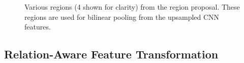 \documentclass[journal]{IEEEtran}
\begin{document}
\begin{figure}[t]
\vspace{-0.5 cm}
\renewcommand*\thesubfigure{\arabic{subfigure}}
    \centering
    \hfill
        \hfill
            \hfill
    \caption{Various regions (4 shown for clarity) from the region proposal. These regions are used for bilinear pooling from the upsampled CNN features. }
    \label{fig:regions}
\vspace{-0.3 cm}    
\end{figure}
\vspace{-0.2 cm}
\subsection{Relation-Aware Feature Transformation}\label{sec:feat}
\end{document}
